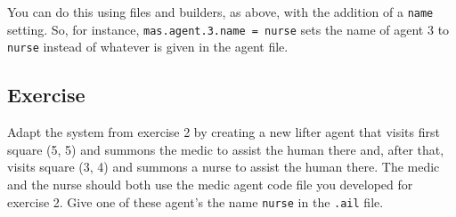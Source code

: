 \documentclass[a4]{article}
\begin{document}
You can do this using files and builders, as above, with the addition of a \texttt{name} setting.  So, for instance, \texttt{mas.agent.3.name = nurse} sets the name of agent 3 to \texttt{nurse} instead of whatever is given in the agent file.

\subsection{Exercise}
Adapt the system from exercise 2 by creating a new lifter agent that visits first square (5, 5) and summons the medic to assist the human there and, after that, visits square (3, 4) and summons a nurse to assist the human there.  The medic and the nurse should both use the medic agent code file you developed for exercise 2.  Give one of these agent's the name \texttt{nurse} in the \texttt{.ail} file.
\end{document}
